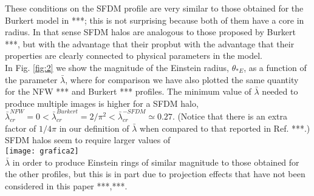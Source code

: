 \documentclass[10pt, letterpaper]{article}
\begin{document}
\begin{multicols}{2}
		These conditions on the SFDM profile are very similar to those obtained for the Burkert model in ***; this is not surprising because both of them have a core in radius. In that sense SFDM halos are analogous to those proposed by Burkert ***, but with the advantage that their propbut with the advantage that their properties are clearly connected to physical parameters in the model.\\
		In Fig. \ref{fig:2} we show the magnitude of the Einstein radius, $\theta_{*E}$, as a function of the parameter $\bar{\lambda}$, where for comparison we have also plotted the same quantity for the NFW *** and Burkert *** profiles. The minimum value of $\bar{\lambda}$ needed to produce multiple images is higher for a SFDM halo, $\bar{\lambda}_{cr}^{NFW}=0<\bar{\lambda}_{cr}^{Burkert}=2/\pi^2<\bar{\lambda}_{cr}^{-SFDM}\simeq0.27$. (Notice that there is an extra factor of $1/4\pi$ in our definition of $\bar{\lambda}$ when compared to that reported in Ref. ***.) SFDM halos seem to require larger values of \\
		\texttt{[image: grafica2]}\label{fig:2}
		\\$\bar{\lambda}$	in order to produce Einstein rings of similar magnitude to those obtained for the other profiles, but this is in part due to projection effects that have not been considered in this paper ***,***.

\end{multicols}
\end{document}
